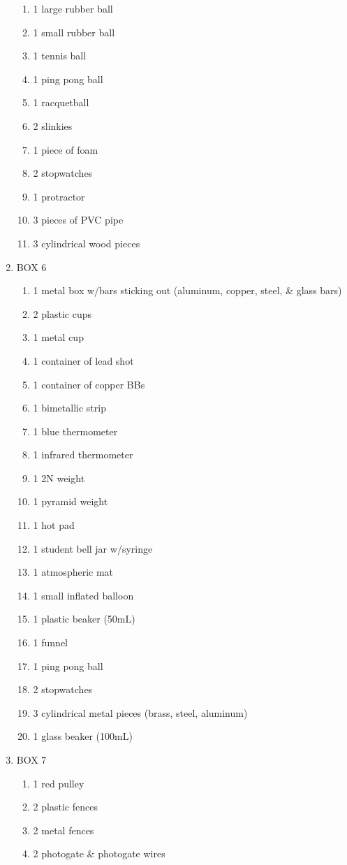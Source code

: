 \documentclass[10pt]{article}
\begin{document}
\begin{enumerate}
\begin{enumerate}
\item 1 large rubber ball
\item 1 small rubber ball
\item 1 tennis ball
\item 1 ping pong ball
\item 1 racquetball
\item 2 slinkies
\item 1 piece of foam
\item 2 stopwatches
\item 1 protractor
\item 3 pieces of PVC pipe
\item 3 cylindrical wood pieces
\end{enumerate}
\item BOX 6
\begin{enumerate}
\item 1 metal box w/bars sticking out (aluminum, copper, steel, \& glass bars)
\item 2 plastic cups
\item 1 metal cup
\item 1 container of lead shot
\item 1 container of copper BBs
\item 1 bimetallic strip
\item 1 blue thermometer
\item 1 infrared thermometer
\item 1 2N weight
\item 1 pyramid weight
\item 1 hot pad
\item 1 student bell jar w/syringe
\item 1 atmospheric mat
\item 1 small inflated balloon
\item 1 plastic beaker (50mL)
\item 1 funnel
\item 1 ping pong ball
\item 2 stopwatches
\item 3 cylindrical metal pieces (brass, steel, aluminum)
\item 1 glass beaker (100mL)
\end{enumerate}
\item BOX 7
\begin{enumerate}
\item 1 red pulley
\item 2 plastic fences
\item 2 metal fences
\item 2 photogate \& photogate wires

\end{enumerate}
\end{enumerate}
\end{document}
